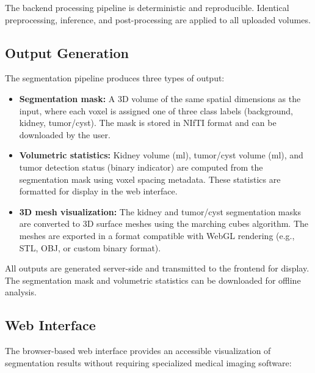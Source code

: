 The backend processing pipeline is deterministic and reproducible. Identical preprocessing, inference, and post-processing are applied to all uploaded volumes.

\subsection{Output Generation}

The segmentation pipeline produces three types of output:

\begin{itemize}
    \item \textbf{Segmentation mask:} A 3D volume of the same spatial dimensions as the input, where each voxel is assigned one of three class labels (background, kidney, tumor/cyst). The mask is stored in NIfTI format and can be downloaded by the user.
    \item \textbf{Volumetric statistics:} Kidney volume (ml), tumor/cyst volume (ml), and tumor detection status (binary indicator) are computed from the segmentation mask using voxel spacing metadata. These statistics are formatted for display in the web interface.
    \item \textbf{3D mesh visualization:} The kidney and tumor/cyst segmentation masks are converted to 3D surface meshes using the marching cubes algorithm. The meshes are exported in a format compatible with WebGL rendering (e.g., STL, OBJ, or custom binary format). %
\end{itemize}

All outputs are generated server-side and transmitted to the frontend for display. The segmentation mask and volumetric statistics can be downloaded for offline analysis.

\subsection{Web Interface}

The browser-based web interface provides an accessible visualization of segmentation results without requiring specialized medical imaging software:


